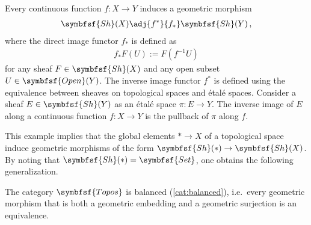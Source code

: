     \begin{example}\label{topos:topological_spaces}
        Every continuous function $f:X\rightarrow Y$ induces a geometric morphism
        \begin{gather}
            \symbfsf{Sh}(X)\adj{f^*}{f_*}\symbfsf{Sh}(Y)\,,
        \end{gather}
        where the direct image functor $f_*$ is defined as
        \begin{gather}
            f_*F(U) := F(f^{-1}U)
        \end{gather}
        for any sheaf $F\in\symbfsf{Sh}(X)$ and any open subset $U\in\symbfsf{Open}(Y)$. The inverse image functor $f^*$ is defined using the equivalence between sheaves on topological spaces and \'etal\'e spaces. Consider a sheaf $E\in\symbfsf{Sh}(Y)$ as an \'etal\'e space $\pi:E\rightarrow Y$. The inverse image of $E$ along a continuous function $f:X\rightarrow Y$ is the pullback of $\pi$ along $f$.
    \end{example}

    This example implies that the global elements $\ast\rightarrow X$ of a topological space induce geometric morphisms of the form $\symbfsf{Sh}(\ast)\rightarrow\symbfsf{Sh}(X)$. By noting that $\symbfsf{Sh}(\ast)=\symbfsf{Set}$, one obtains the following generalization.


    \begin{property}[Balanced]
        The category $\symbfsf{Topos}$ is balanced (\cref{cat:balanced}), i.e.~every geometric morphism that is both a geometric embedding and a geometric surjection is an equivalence. 
    \end{property}

